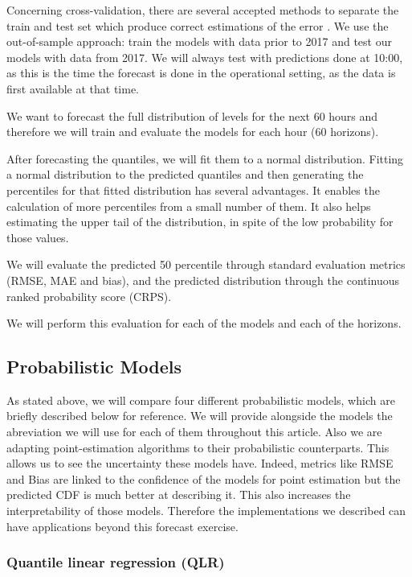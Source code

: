 \documentclass[a4paper,3p,sort&compress]{elsarticle}
\begin{document}
Concerning cross-validation, there are several accepted methods to
separate the train and test set which produce correct estimations of
the error \cite{bergmeir_note_2018}. We use the out-of-sample
approach: train the models with data prior to 2017 and test our models
with data from 2017. We will always test with predictions done at
10:00, as this is the time the forecast is done in the operational
setting, as the data is first available at that time.

We want to forecast the full distribution of \no
levels for the next 60 hours and therefore we will train and evaluate
the models for each hour (60 horizons).

After forecasting the quantiles, we will fit them to a normal
distribution. Fitting a normal distribution to the predicted quantiles
and then generating the percentiles for that fitted distribution has
several advantages. It enables the calculation of more percentiles
from a small number of them.  It also helps estimating the upper tail
of the distribution, in spite of the low probability for those values.

We will evaluate the predicted 50 percentile through standard
evaluation metrics (RMSE, MAE and bias), and the predicted
distribution through the continuous ranked probability score (CRPS).

We will perform this evaluation for
each of the models and each of the horizons.

\subsection{Probabilistic Models}
\label{sec:models}

As stated above, we will compare four different probabilistic models,
which are briefly described below for reference. We will provide 
alongside the models the abreviation we will use for each of them 
throughout this article. Also we are adapting point-estimation 
algorithms to their probabilistic counterparts. This allows 
us to see the uncertainty these models have. Indeed, metrics like 
RMSE and Bias are linked to the confidence of the models for 
point estimation but the predicted CDF is much better at describing 
it. This also increases the interpretability of those models.
Therefore 
the implementations we described can have applications beyond 
this forecast exercise.

\subsubsection{Quantile linear regression (QLR)}
\end{document}
